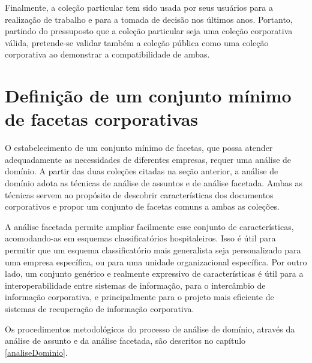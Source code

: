 Finalmente, a coleção particular tem sido usada por seus usuários para a realização de trabalho e para a tomada de decisão nos últimos anos. Portanto, partindo do pressuposto que a coleção particular seja uma coleção corporativa válida, pretende-se validar também a coleção pública como uma coleção corporativa ao demonstrar a compatibilidade de ambas.

\section{Definição de um conjunto mínimo de facetas corporativas}

O estabelecimento de um conjunto mínimo de facetas, que possa atender adequadamente as necessidades de diferentes empresas, requer uma análise de domínio. A partir das duas coleções citadas na seção anterior, a análise de domínio adota as técnicas de análise de assuntos e de análise facetada. Ambas as técnicas servem ao propósito de descobrir características dos documentos corporativos e propor um conjunto de facetas comuns a ambas as coleções.

A análise facetada permite ampliar facilmente esse conjunto de características, a\-co\-mo\-dan\-do-as em esquemas classificatórios hospitaleiros. Isso é útil para permitir que um esquema classificatório mais generalista seja personalizado para uma empresa específica, ou para uma unidade organizacional específica. Por outro lado, um conjunto genérico e realmente expressivo de características é útil para a interoperabilidade entre sistemas de informação, para o intercâmbio de informação corporativa, e principalmente para o projeto mais eficiente de sistemas de recuperação de informação corporativa.%

Os procedimentos metodológicos do processo de análise de domínio, através da análise de assunto e da análise facetada, são descritos no capítulo \ref{analiseDominio}.


